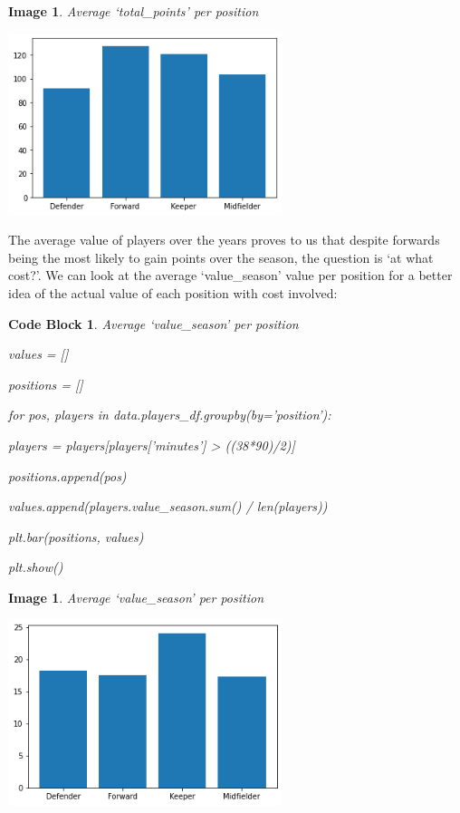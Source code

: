 \documentclass[12pt, a4paper, oneside]{book}
\newtheorem{image}[theorem]{Image}
\newtheorem{codeblock}[theorem]{Code Block}
\numberwithin{equation}{section}
\begin{document}
\begin{image} \label{Average total points per position}
  Average `total\_points' per position

  \vspace{0.5cm}

  \centerline{\includegraphics[width=0.6\textwidth]{images/prediction/pre-analysis/avg-total-points-per-pos.png}}
\end{image}

The average value of players over the years proves to us that despite forwards being the most likely to gain points over the season, the question is `at what cost?'. We can look at the average `value\_season' value per position for a better idea of the actual value of each position with cost involved:

\begin{codeblock}
  Average `value\_season' per position

  values = []
  
  positions = []

  for pos, players in data.players\_df.groupby(by='position'):

  \hspace{\parindent}players = players[players['minutes'] > ((38*90)/2)]

  \hspace{\parindent}positions.append(pos)
  
  values.append(players.value\_season.sum() / len(players))

  plt.bar(positions, values)
  
  plt.show()
\end{codeblock}

\begin{image} \label{Average value per position}
  Average `value\_season' per position

  \vspace{0.5cm}

  \centerline{\includegraphics[width=0.6\textwidth]{images/prediction/pre-analysis/avg-value-season-per-pos.png}}
\end{image}
\end{document}
